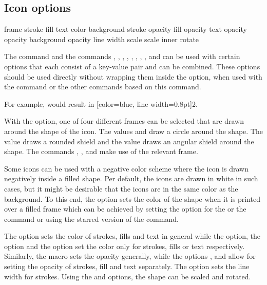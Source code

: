 \documentclass[a4paper]{article}
\begin{document}
\subsection{Icon options}

\begin{macrodef}
frame
stroke
fill
text
color
background
stroke opacity
fill opacity
text opacity
opacity
background opacity
line width
scale
scale inner
rotate
\end{macrodef}
The \macro{\RPGIconsUseIcon} command and the commands \macro{\die}, \macro{\ability}, \macro{\saving}, \macro{\spell}, \macro{\spellschool}, \macro{\damage}, \macro{\attack}, \macro{\condition}, \macro{\alignment} and \macro{\currency} can be used with certain options that each consist of a key-value pair and can be combined. These options should be used directly without wrapping them inside the  option, when used with the \macro{\RPGIconsUseIcon} command or the other commands based on this command.

For example,  would result in [color=blue, line width=0.8pt]{2}.

With the  option, one of four different frames can be selected that are drawn around the shape of the icon. The values  and  draw a circle around the shape. The value  draws a rounded shield and the value  draws an angular shield around the shape. The commands \macro{\ability}, \macro{\saving}, \macro{\spellschool} and \macro{\damage} make use of the relevant frame.

Some icons can be used with a negative color scheme where the icon is drawn negatively inside a filled shape. Per default, the icons are drawn in white in such cases, but it might be desirable that the icons are in the same color as the background. To this end, the  option sets the color of the shape when it is printed over a filled frame which can be achieved by setting the  option for the \macro{\ability} or the \macro{\spellschool} command or using the starred version of the \macro{\RPGIconsUseIcon} command.

The  option sets the color of strokes, fills and text in general while the  option, the  option and the  option set the color only for strokes, fills or text respectively. Similarly, the  macro sets the opacity generally, while the options ,  and  allow for setting the opacity of strokes, fill and text separately. The option  sets the line width for strokes. Using the  and  options, the shape can be scaled and rotated.
\end{document}
